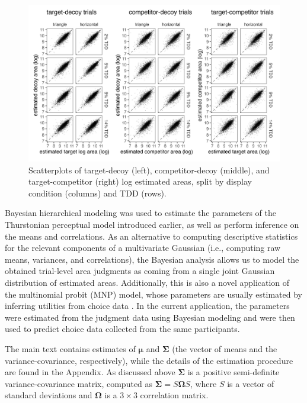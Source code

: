 \begin{figure}
   \centering
   \includegraphics[width=\textwidth]{figures/circleAreaPhase_cor_plot_all_no_outliers.jpg}
   \caption{Scatterplots of target-decoy (left), competitor-decoy (middle), and target-competitor (right) log estimated areas, split by display condition (columns) and TDD (rows).}
   \label{fig:raw_cors}
\end{figure}

Bayesian hierarchical modeling was used to estimate the parameters of the Thurstonian perceptual model introduced earlier, as well as perform inference on the means and correlations.  As an alternative to computing descriptive statistics for the relevant components of a multivariate Gaussian (i.e., computing raw means, variances, and correlations), the Bayesian analysis allows us to model the obtained trial-level area judgments as coming from a single joint Gaussian distribution of estimated areas.  Additionally, this is also a novel application of the multinomial probit (MNP) model, whose parameters are usually estimated by inferring utilities from choice data \parencite{train2009discrete}. In the current application, the parameters were estimated from the judgment data using Bayesian modeling and were then used to predict choice data collected from the same participants. 

The main text contains estimates of $\boldsymbol{\mu}$ and $\boldsymbol{\Sigma}$ (the vector of means and the variance-covariance, respectively), while the details of the estimation procedure are found in the Appendix. As discussed above $\boldsymbol{\Sigma}$ is a positive semi-definite variance-covariance matrix, computed as $\boldsymbol{\Sigma}=S\boldsymbol{\Omega}S$, where $S$ is a vector of standard deviations and $\boldsymbol{\Omega}$ is a $3\times3$ correlation matrix. 

